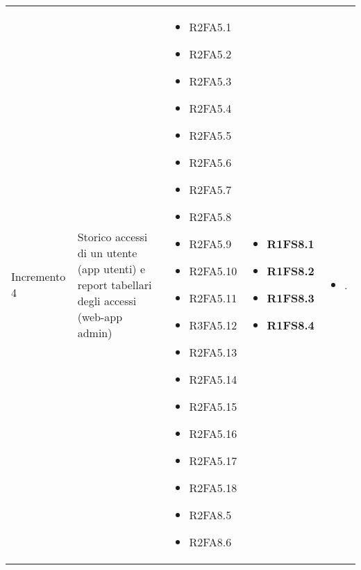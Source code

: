{\begin{longtable}{C{2.5cm} C{3.2cm} C{2.8cm} C{2.8cm} C{2.8cm}}
Incremento 4 & Storico accessi di un utente (app utenti) e report tabellari degli accessi (web-app admin) & \begin{itemize}
    \item[ ] R2FA5.1
    \item[ ] R2FA5.2
    \item[ ] R2FA5.3
    \item[ ] R2FA5.4
    \item[ ] R2FA5.5
    \item[ ] R2FA5.6
    \item[ ] R2FA5.7
    \item[ ] R2FA5.8
    \item[ ] R2FA5.9
    \item[ ] R2FA5.10
    \item[ ] R2FA5.11
    \item[ ] R3FA5.12
    \item[ ] R2FA5.13
    \item[ ] R2FA5.14
    \item[ ] R2FA5.15
    \item[ ] R2FA5.16
    \item[ ] R2FA5.17
    \item[ ] R2FA5.18
    \item[ ] R2FA8.5
    \item[ ] R2FA8.6
\end{itemize} & \begin{itemize} 
    \item[ ] \textbf{R1FS8.1}
    \item[ ] \textbf{R1FS8.2}
    \item[ ] \textbf{R1FS8.3}
    \item[ ] \textbf{R1FS8.4}  
\end{itemize} & \begin{itemize} 
    \item[ ] .        
\end{itemize}\\


\end{longtable}}
